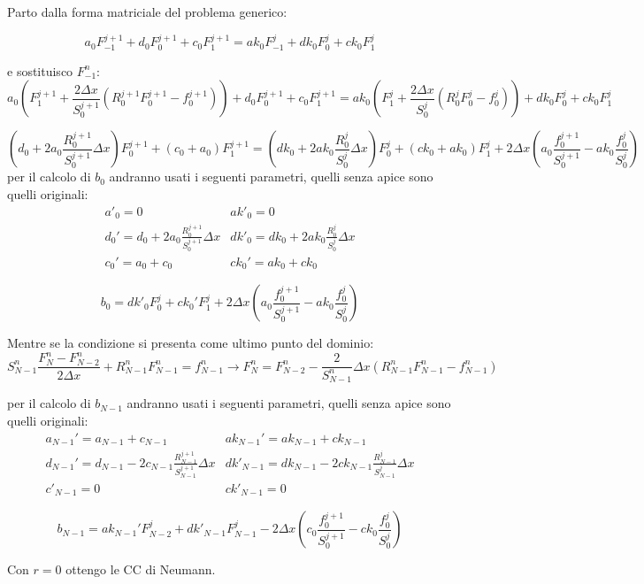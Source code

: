 \documentclass[]{article}
\newcommand{\lr}[3]{\ensuremath{\left#1 #3 \right#2}}
\newcommand{\lrt}[1]{\lr{(}{)}{#1}}
\numberwithin{equation}{subsection}
\begin{document}
Parto dalla forma matriciale del problema generico:

$$
a_0  F_{-1}^{j+1} + d_0 F_{0}^{j+1} + c_{0}F_{1}^{j+1} = 
ak_0 F_{-1}^{j}   + dk_0 F_{0}^{j}  + ck_0 F_{1}^{j}
$$

e sostituisco $F_{-1}^{n}$:
$$
a_0 \lrt{ F_{1}^{j+1} + \frac {2 \Delta x}{S_0^{j+1}} \lrt{R_0^{j+1}F_{0}^{j+1}-f^{j+1}_0}} +d_0 F_{0}^{j+1} +c_{0}F_{1}^{j+1} = 
ak_0 \lrt{F_{1}^{j} + \frac {2 \Delta x}{S_0^{j}} \lrt{R_0^jF_{0}^{j}-f^{j}_0}} + dk_0 F_{0}^{j} + ck_0 F_{1}^{j}
$$

$$
\lrt{d_0 + 2 a_0 \frac{R_0^{j+1}}{S_0^{j+1}}\Delta x} F_0^{j+1} + \lrt{c_0+a_0}F^{j+1}_1 = 
\lrt{dk_0 + 2 ak_0 \frac{R_0^{j}}{S_0^{j}}\Delta x} F_0^{j} + \lrt{ck_0+ak_0}F^{j}_1 + 
2 \Delta x \lrt{a_0 \frac{f^{j+1}_0}{S^{j+1}_0}-ak_0\frac{f^j_0}{S^{j}_0}}
$$
per il calcolo di $b_0$ andranno usati i seguenti parametri, quelli senza apice sono quelli originali:
$$
\begin{array}{ll}
a'_0 = 0 & ak'_0= 0\\
d_0' = d_0 + 2 a_0 \frac{R_0^{j+1}}{S_0^{j+1}}\Delta x& dk'_0 = dk_0 + 2 ak_0 \frac{R_0^{j}}{S_0^{j}}\Delta x\\
c_0' = a_0+c_0 & ck_0' = ak_0+ck_0
\end{array}
$$

$$b_0 = dk'_0 F_0^j  + ck_0' F_1^j + 2 \Delta x \lrt{a_0 \frac{f^{j+1}_0}{S^{j+1}_0}-ak_0\frac{f^j_0}{S^{j}_0}}$$

Mentre se la condizione si presenta come ultimo punto del dominio:
$$S_{N-1}^n\frac{F_{N}^{n}-F_{N-2}^{n}}{2\Delta x} + R_{N-1}^nF_{N-1}^{n} = f_{N-1}^n  \to 
F_{N}^{n} = F_{N-2}^{n} - \frac 2{S_{N-1}^n}\Delta x \lrt{R_{N-1}^nF_{N-1}^{n}-f^n_{N-1}}$$

per il calcolo di $b_{N-1}$ andranno usati i seguenti parametri, quelli senza apice sono quelli originali:
$$
\begin{array}{ll}
a_{N-1}' = a_{N-1}+c_{N-1} & ak_{N-1}' = ak_{N-1}+ck_{N-1}\\
d_{N-1}' = d_{N-1} - 2 c_{N-1} \frac{R_{N-1}^{j+1}}{S_{N-1}^{j+1}}\Delta x& dk'_{N-1} = dk_{N-1} - 2 ck_{N-1} \frac{R_{N-1}^{j}}{S_{N-1}^{j}}\Delta x\\
c'_{N-1} = 0 & ck'_{N-1}= 0
\end{array}
$$

$$b_{N-1} = ak_{N-1}' F_{N-2}^j + dk'_{N-1} F_{N-1}^j - 2 \Delta x \lrt{c_0 \frac{f^{j+1}_0}{S^{j+1}_0}-ck_0\frac{f^j_0}{S^{j}_0}}$$

Con $r=0$ ottengo le CC di Neumann.
\end{document}
